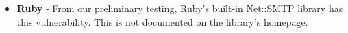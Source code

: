 \begin{itemize}
\item{\textbf{Ruby}} -
From our preliminary testing, Ruby's built-in Net::SMTP library has this vulnerability. This is not documented on the library's homepage.

%

\end{itemize}